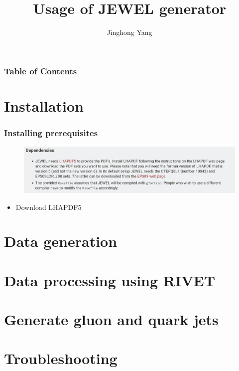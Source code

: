 \documentclass{beamer}
\title{Usage of JEWEL generator}
\author{Jinghong Yang}
\begin{document}
\begin{frame}
\titlepage
\end{frame}

\begin{frame}
\frametitle{Table of Contents}
\tableofcontents
\end{frame}

\section{Installation}
\begin{frame}
 \frametitle{Installing prerequisites}

 \begin{figure}[h]
  \centering
  \includegraphics[width=0.9\linewidth]{dependencies.png}
 \end{figure}

 \begin{itemize}
  \item Download LHAPDF5
 \end{itemize}


\end{frame}

\section{Data generation}

\section{Data processing using RIVET}

\section{Generate gluon and quark jets}

\section{Troubleshooting}
\end{document}
